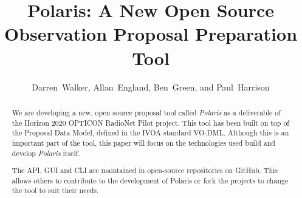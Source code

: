 \documentclass[11pt,twoside]{article}
\begin{document}
\title{Polaris: A New Open Source Observation Proposal Preparation Tool}

\author{Darren~Walker, Allan~England, Ben~Green, and Paul~Harrison}





\begin{abstract}
    We are developing a new, open source proposal tool called \emph{Polaris} as a deliverable of the Horizon
    2020 OPTICON RadioNet Pilot project.
    This tool has been built on top of the Proposal Data Model, defined in the IVOA standard VO-DML\@.
    Although this is an important part of the tool, this paper will focus on the technologies
    used build and develop \emph{Polaris} itself.

    The API, GUI and CLI are maintained in open-source repositories on GitHub.
    This allows others to contribute to the development of Polaris or fork the projects to change the tool
    to suit their needs.
\end{abstract}
\end{document}
